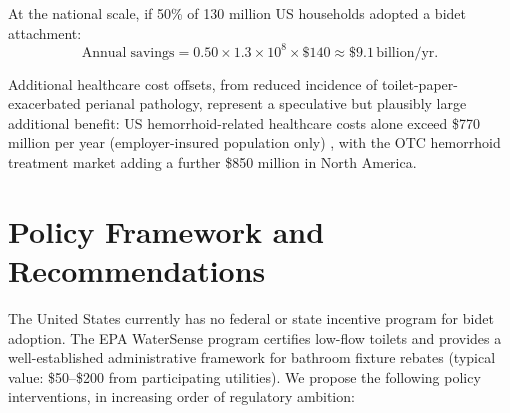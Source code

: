 \documentclass[aps,prfluids,reprint,amsmath,amssymb,floatfix]{revtex4-2}
\begin{document}
At the national scale, if 50\% of 130 million US households adopted a
bidet attachment:
\begin{equation}
    \mathrm{Annual\;savings} = 0.50 \times 1.3 \times 10^8 \times \$140
    \approx \$9.1\,\mathrm{billion/yr}.
\end{equation}

Additional healthcare cost offsets, from reduced incidence of toilet-paper-exacerbated
perianal pathology, represent a speculative but plausibly large additional
benefit: US hemorrhoid-related healthcare costs alone exceed \$770 million
per year (employer-insured population only) \citep{Peery2014}, with the OTC
hemorrhoid treatment market adding a further \$850 million in North America.

\section{Policy Framework and Recommendations}
\label{sec:policy}

The United States currently has no federal or state incentive program for
bidet adoption. The EPA WaterSense program certifies low-flow toilets and
provides a well-established administrative framework for bathroom fixture
rebates (typical value: \$50--\$200 from participating utilities). We propose
the following policy interventions, in increasing order of regulatory ambition:
\end{document}
